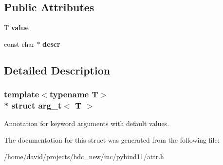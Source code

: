 \subsection*{Public Attributes}
\begin{DoxyCompactItemize}
\item 
T {\bfseries value}\hypertarget{structarg__t_ad5bdc684406d364c23d871cb2be63b2c}{}\label{structarg__t_ad5bdc684406d364c23d871cb2be63b2c}

\item 
const char $\ast$ {\bfseries descr}\hypertarget{structarg__t_ad12b450c9f74d24d4c3f82a2a6af4c37}{}\label{structarg__t_ad12b450c9f74d24d4c3f82a2a6af4c37}

\end{DoxyCompactItemize}


\subsection{Detailed Description}
\subsubsection*{template$<$typename T$>$\\*
struct arg\+\_\+t$<$ T $>$}

Annotation for keyword arguments with default values. 

The documentation for this struct was generated from the following file\+:\begin{DoxyCompactItemize}
\item 
/home/david/projects/hdc\+\_\+new/inc/pybind11/attr.\+h\end{DoxyCompactItemize}
